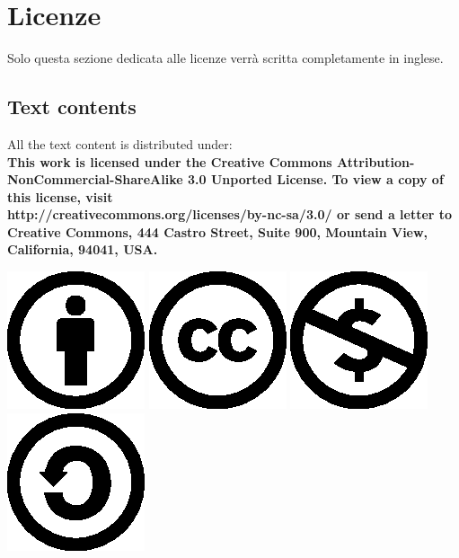 \section*{Licenze}

Solo questa sezione dedicata alle licenze verr\`a scritta completamente in
inglese.

\subsection*{Text contents}
All the text content is distributed under:\\
\textbf{
This work is licensed under the Creative Commons
Attribution-NonCommercial-ShareAlike 3.0 Unported License. To view a copy of 
this license, visit
\\http://creativecommons.org/licenses/by-nc-sa/3.0/  or send a
letter to Creative Commons, 444 Castro Street, Suite 900, Mountain View, 
California, 94041, USA.} 



\begin{center}
\includegraphics{cc-icons-eps/by}
\includegraphics{cc-icons-eps/cc}
\includegraphics{cc-icons-eps/nc}
\includegraphics{cc-icons-eps/sa}
\end{center}

